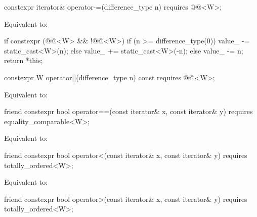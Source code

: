 \begin{itemdecl}
constexpr iterator& operator-=(difference_type n)
  requires @@<W>;
\end{itemdecl}

\begin{itemdescr}
\pnum
\effects
Equivalent to:
\begin{codeblock}
if constexpr (@@<W> && !@@<W>) {
  if (n >= difference_type(0))
    value_ -= static_cast<W>(n);
  else
    value_ += static_cast<W>(-n);
} else {
  value_ -= n;
}
return *this;
\end{codeblock}
\end{itemdescr}

\begin{itemdecl}
constexpr W operator[](difference_type n) const
  requires @@<W>;
\end{itemdecl}

\begin{itemdescr}
\pnum
\effects
Equivalent to: 
\end{itemdescr}

\begin{itemdecl}
friend constexpr bool operator==(const iterator& x, const iterator& y)
  requires equality_comparable<W>;
\end{itemdecl}

\begin{itemdescr}
\pnum
\effects
Equivalent to: 
\end{itemdescr}

\begin{itemdecl}
friend constexpr bool operator<(const iterator& x, const iterator& y)
  requires totally_ordered<W>;
\end{itemdecl}

\begin{itemdescr}
\pnum
\effects
Equivalent to: 
\end{itemdescr}

\begin{itemdecl}
friend constexpr bool operator>(const iterator& x, const iterator& y)
  requires totally_ordered<W>;
\end{itemdecl}

